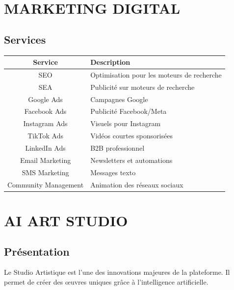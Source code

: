 \documentclass[12pt,a4paper,oneside]{book}
\begin{document}
\chapter{MARKETING DIGITAL}

\section{Services}
\begin{center}
\begin{tabular}{|c|p{10cm}|}
\hline
\rowcolor{electroncyan}
\color{white}\textbf{Service} & \color{white}\textbf{Description} \\
\hline
SEO & Optimisation pour les moteurs de recherche \\
\hline
SEA & Publicité sur moteurs de recherche \\
\hline
Google Ads & Campagnes Google \\
\hline
Facebook Ads & Publicité Facebook/Meta \\
\hline
Instagram Ads & Visuels pour Instagram \\
\hline
TikTok Ads & Vidéos courtes sponsorisées \\
\hline
LinkedIn Ads & B2B professionnel \\
\hline
Email Marketing & Newsletters et automations \\
\hline
SMS Marketing & Messages texto \\
\hline
Community Management & Animation des réseaux sociaux \\
\hline
\end{tabular}
\end{center}

\chapter{AI ART STUDIO}

\section{Présentation}
Le Studio Artistique est l'une des innovations majeures de la plateforme. Il permet de créer des œuvres uniques grâce à l'intelligence artificielle.
\end{document}
